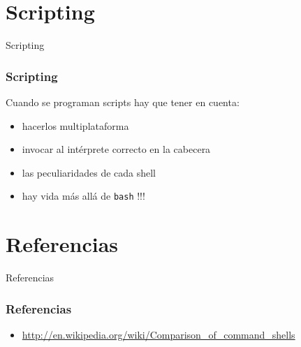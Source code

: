 \documentclass{beamer}
\begin{document}
\section{Scripting}
\begin{frame}
  \begin{center}
    \huge{Scripting}
  \end{center}
\end{frame}

\begin{frame}
  \frametitle{Scripting}
  Cuando se programan scripts hay que tener en cuenta:
  \begin{itemize}
    \item hacerlos multiplataforma
    \item invocar al intérprete correcto en la cabecera
    \item las peculiaridades de cada shell
    \medskip
    \item hay vida más allá de \texttt{bash} !!!
  \end{itemize}
\end{frame}


\section{Referencias}
\begin{frame}
  \begin{center}
    \huge{Referencias}
  \end{center}
\end{frame}

\begin{frame}
  \frametitle{Referencias}
  \begin{itemize}
    \item \url{http://en.wikipedia.org/wiki/Comparison\_of\_command\_shells}
  \end{itemize}
\end{frame}
\end{document}
